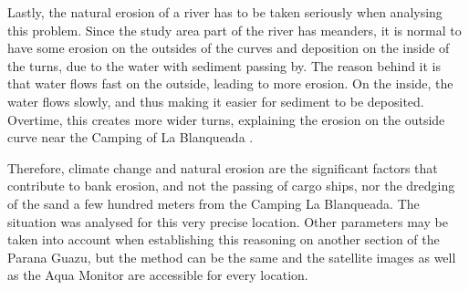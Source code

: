 Lastly, the natural erosion of a river has to be taken seriously when analysing this problem. Since the study area part of the river has meanders, it is normal to have some erosion on the outsides of the curves and deposition on the inside of the turns, due to the water with sediment passing by. The reason behind it is that water flows fast on the outside, leading to more erosion. On the inside, the water flows slowly, and thus making it easier for sediment to be deposited. Overtime, this creates more wider turns, explaining the erosion on the outside curve near the Camping of La Blanqueada \autocite{serenaniWhyRiversCurve2025}.

Therefore, climate change and natural erosion are the significant factors that contribute to bank erosion, and not the passing of cargo ships, nor the dredging of the sand a few hundred meters from the Camping La Blanqueada.
The situation was analysed for this very precise location. Other parameters may be taken into account when establishing this reasoning on another section of the Parana Guazu, but the method can be the same and the satellite images as well as the Aqua Monitor are accessible for every location. 